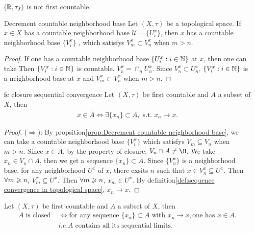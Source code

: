\begin{example}{}{}
    $(\mathbb{R},\tau_f)$ is not first countable.
\end{example}

\begin{proposition}{}{Decrement countable neighborhood base}
    Let $(X,\tau)$ be a topological space. If $x\in X$ has a countable neighborhood base $\mathcal{U}=\{U_i^x\}$,
    then $x$ has a countable neighborhood base $\{V_i^x\}$ , which satisfys $V_m^x\subset V_n^x$ when $m>n$.
\end{proposition}
\begin{proof}
    If one has a countable neighborhood base $\{U_i^x:i\in\mathbb{N}\}$ at $x$, then one can take
    Then $\{V_i^x:i\in\mathbb{N}\}$ is countable. 
    $V_n^x=\cap_{n}U_n^x$. Since $V_n^x\subset U_n^x$, $\{V_i^x:i\in\mathbb{N}\}$ is a neighborhood base at $x$ and $V_m^x\subset V_n^x$ when $m>n$.
\end{proof}

\begin{proposition}{}{fc closure sequential convergence}
    Let $(X,\tau)$ be first countable and $A$ a subset of $X$, then
    \begin{align*}
        x\in\overline{A}\Leftrightarrow \exists \{x_n\}\subset A, \text{ s.t. } x_n\rightarrow x.
    \end{align*}
\end{proposition}

\begin{proof}
    ($\Rightarrow$): By propsition\ref{prop:Decrement countable neighborhood base}, we can take a countable neighborhood base $\{V_i^x\}$ which 
    satisfys $V_m\subseteq V_n$ when $m>n$. Since $x\in A$, by the property of closure, $V_n\cap A\neq \O$.
    We take $x_n\in V_n\cap A$, then we get a sequence $\{x_n\}\subset A$. 
    Since $\{V_n^x\}$ is a neighborhood base, for any neighborhood $U^x$ of $x$, there exsits $n$ such that $x\in V_n^x\subseteq U^x$. 
    Then $\forall m\geqslant n$, $V_m^x\subseteq U^x$. 
    Then $\forall m\geqslant n$, $x_m\in U^x$. By definition\ref{def:sequence convergence in topological space}, $x_n\rightarrow x$.
\end{proof}

\begin{corollary}{}{}
    Let $(X,\tau)$ be first countable and $A$ a subset of $X$, then
    \begin{align*}
        A \text{ is closed }&\Leftrightarrow \text{for any sequence }\{x_n\}\subset A \text{ with } x_n\rightarrow x, \text{one has } x\in A.\\
        & i.e. A \text{ contains all its sequential limits.}
    \end{align*}
\end{corollary}

